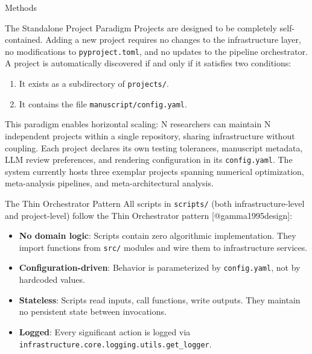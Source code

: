 \documentclass[
  ignorenonframetext,
]{beamer}
\providecommand{\tightlist}{%
  \setlength{\itemsep}{0pt}\setlength{\parskip}{0pt}}
\begin{document}
\begin{frame}[fragile]{Methods}
\begin{block}{The Standalone Project Paradigm}
\protect{}\label{the-standalone-project-paradigm}
Projects are designed to be completely self-contained. Adding a new
project requires no changes to the infrastructure layer, no
modifications to \texttt{pyproject.toml}, and no updates to the pipeline
orchestrator. A project is automatically discovered if and only if it
satisfies two conditions:

\begin{enumerate}
\tightlist
\item
  It exists as a subdirectory of \texttt{projects/}.
\item
  It contains the file \texttt{manuscript/config.yaml}.
\end{enumerate}

This paradigm enables horizontal scaling: N researchers can maintain N
independent projects within a single repository, sharing infrastructure
without coupling. Each project declares its own testing tolerances,
manuscript metadata, LLM review preferences, and rendering configuration
in its \texttt{config.yaml}. The system currently hosts three exemplar
projects spanning numerical optimization, meta-analysis pipelines, and
meta-architectural analysis.
\end{block}

\begin{block}{The Thin Orchestrator Pattern}
\protect{}\label{the-thin-orchestrator-pattern}
All scripts in \texttt{scripts/} (both infrastructure-level and
project-level) follow the Thin Orchestrator pattern
{[}@gamma1995design{]}:

\begin{itemize}
\tightlist
\item
  \textbf{No domain logic}: Scripts contain zero algorithmic
  implementation. They import functions from \texttt{src/} modules and
  wire them to infrastructure services.
\item
  \textbf{Configuration-driven}: Behavior is parameterized by
  \texttt{config.yaml}, not by hardcoded values.
\item
  \textbf{Stateless}: Scripts read inputs, call functions, write
  outputs. They maintain no persistent state between invocations.
\item
  \textbf{Logged}: Every significant action is logged via
  \texttt{infrastructure.core.logging.utils.get\_logger}.
\end{itemize}


\end{block}
\end{frame}
\end{document}
